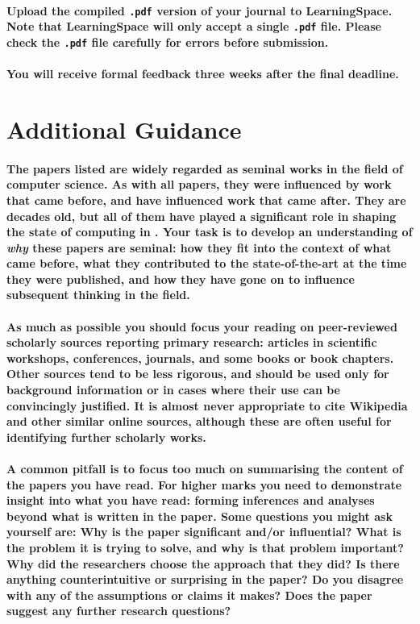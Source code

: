 \documentclass{../../fal_assignment}
\begin{document}
\paragraph{
Upload the compiled \texttt{.pdf} version of your journal to LearningSpace.
Note that LearningSpace will only accept a single \texttt{.pdf} file.
Please check the \texttt{.pdf} file carefully for errors before submission.
}

\paragraph{
You will receive \textbf{formal feedback} three weeks after the final deadline.
}

\section*{Additional Guidance}

\paragraph{
The papers listed are widely regarded as seminal works in the field of computer science.
As with all papers, they were influenced by work that came before,
and have influenced work that came after.
They are decades old, but all of them have played a significant role in shaping the state of computing
in \the\year.
Your task is to develop an understanding of \textit{why} these papers are seminal:
how they fit into the context of what came before,
what they contributed to the state-of-the-art at the time they were published,
and how they have gone on to influence subsequent thinking in the field.
}

\paragraph{
As much as possible you should focus your reading on peer-reviewed scholarly sources reporting primary research:
articles in scientific workshops, conferences, journals, and some books or book chapters.
Other sources tend to be less rigorous, and should be used only for background information
or in cases where their use can be convincingly justified.
It is almost never appropriate to cite Wikipedia and other similar online sources,
although these are often useful for identifying further scholarly works.
}

\paragraph{
A common pitfall is to focus too much on summarising the content of the papers you have read.
For higher marks you need to demonstrate \textbf{insight} into what you have read:
forming inferences and analyses beyond what is written in the paper.
Some questions you might ask yourself are:
Why is the paper significant and/or influential?
What is the problem it is trying to solve, and why is that problem important?
Why did the researchers choose the approach that they did?
Is there anything counterintuitive or surprising in the paper?
Do you disagree with any of the assumptions or claims it makes?
Does the paper suggest any further research questions?
}
\end{document}
